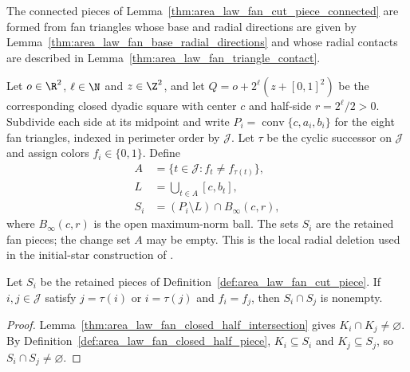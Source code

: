 The connected pieces of Lemma~\ref{thm:area_law_fan_cut_piece_connected}
are formed from fan triangles whose base and radial directions are given by
Lemma~\ref{thm:area_law_fan_base_radial_directions} and whose radial
contacts are described in Lemma~\ref{thm:area_law_fan_triangle_contact}.

\begin{definition}
    \label{def:area_law_fan_cut_piece}
    \leanok
    Let $o\in\R^2$, $\ell\in\N$ and $z\in\Z^2$, and let
    $Q=o+2^\ell(z+[0,1]^2)$ be the corresponding closed dyadic square
    with center $c$ and half-side $r=2^\ell/2>0$.
    Subdivide each side at its midpoint and write
    $P_i=\operatorname{conv}\{c,a_i,b_i\}$ for the eight fan triangles,
    indexed in perimeter order by $\mathcal J$.
    Let $\tau$ be the cyclic successor on $\mathcal J$ and assign colors
    $f_i\in\{0,1\}$. Define
    \begin{align}
        A   & =\{t\in\mathcal J:f_t\ne f_{\tau(t)}\}, \\
        L   & =\bigcup_{t\in A}[c,b_t],               \\
        S_i & =(P_i\setminus L)\cap B_\infty(c,r),
    \end{align}
    where $B_\infty(c,r)$ is the open maximum-norm ball.
    The sets $S_i$ are the retained fan pieces; the change set $A$
    may be empty. This is the local radial deletion used in the
    initial-star construction of \cite[Section~11]{OpenAI2026AreaLaw}.
\end{definition}

\begin{lemma}
    \label{thm:area_law_fan_inactive_radial_intersection}
    \leanok
    Let $S_i$ be the retained pieces of
    Definition~\ref{def:area_law_fan_cut_piece}.
    If $i,j\in\mathcal J$ satisfy $j=\tau(i)$ or $i=\tau(j)$ and $f_i=f_j$, then
    $S_i\cap S_j$ is nonempty.
\end{lemma}
\begin{proof}
    \leanok
    Lemma~\ref{thm:area_law_fan_closed_half_intersection} gives
    $K_i\cap K_j\ne\varnothing$. By
    Definition~\ref{def:area_law_fan_closed_half_piece}, $K_i\subseteq S_i$
    and $K_j\subseteq S_j$, so $S_i\cap S_j\ne\varnothing$.
\end{proof}
